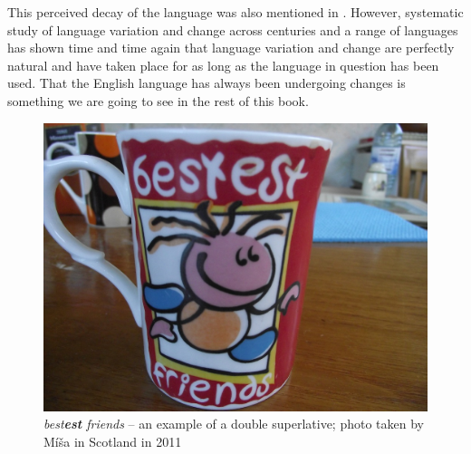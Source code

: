 \noindent This perceived decay of the language was also mentioned in . However, systematic study of language variation and change across centuries and a range of languages has shown time and time again that language variation and change are perfectly natural and have taken place for as long as the language in question has been used. That the English language has always been undergoing changes is something we are going to see in the rest of this book.

\begin{figure}
    \includegraphics[scale=0.34]{chapters/img/bestest.jpg}
    \caption{\textit{best\textbf{est} friends} -- an example of a double superlative; photo taken by Míša in Scotland in 2011}
    \label{fig:bestest}
\end{figure}

